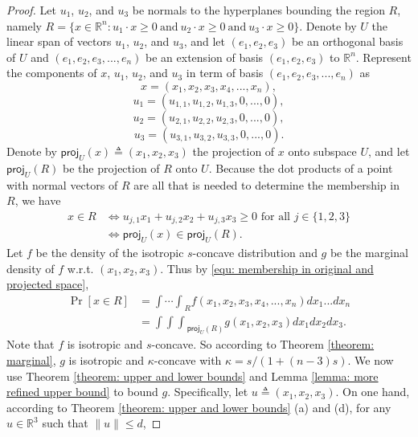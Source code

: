 \documentclass[11pt]{article}
\newcommand{\R}{\mathbb{R}}
\begin{document}
{{{{\medskip
\begin{proof}
Let $u_1$, $u_2$, and $u_3$ be normals to the hyperplanes bounding the region $R$, namely $R=\{x\in\R^n: u_1\cdot x\ge0\ \mbox{and}\ u_2\cdot x\ge 0\ \mbox{and}\ u_3\cdot x\ge 0\}$. Denote by $U$ the linear span of vectors $u_1$, $u_2$, and $u_3$, and let $(e_1,e_2,e_3)$ be an orthogonal basis of $U$ and $(e_1,e_2,e_3,...,e_n)$ be an extension of basis $(e_1,e_2,e_3)$ to $\R^n$. Represent the components of $x$, $u_1$, $u_2$, and $u_3$ in term of basis $(e_1,e_2,e_3,...,e_n)$ as
\begin{equation*}
x=(x_1,x_2,x_3,x_4,...,x_n),
\end{equation*}
\begin{equation*}
u_1=(u_{1,1},u_{1,2},u_{1,3},0,...,0),
\end{equation*}
\begin{equation*}
u_2=(u_{2,1},u_{2,2},u_{2,3},0,...,0),
\end{equation*}
\begin{equation*}
u_3=(u_{3,1},u_{3,2},u_{3,3},0,...,0).
\end{equation*}
Denote by $\textsf{proj}_U(x)\triangleq(x_1,x_2,x_3)$ the projection of $x$ onto subspace $U$, and let $\textsf{proj}_U(R)$ be the projection of $R$ onto $U$. Because the dot products of a point with normal vectors of $R$ are all that is needed to determine the membership in $R$, we have
\begin{equation}
\label{equ: membership in original and projected space}
\begin{split}
x\in R&\Leftrightarrow u_{j,1}x_1+u_{j,2}x_2+u_{j,3}x_3\ge 0\mbox{ for all }j\in\{1,2,3\}\\
&\Leftrightarrow \textsf{proj}_U(x)\in\textsf{proj}_U(R).
\end{split}
\end{equation}
Let $f$ be the density of the isotropic $s$-concave distribution and $g$ be the marginal density of $f$ w.r.t. $(x_1,x_2,x_3)$. Thus by \eqref{equ: membership in original and projected space},
\begin{equation*}
\begin{split}
\Pr[x\in R]&={\int\cdots\int}_R f(x_1,x_2,x_3,x_4,...,x_n)dx_1...dx_n\\
&={\int\int\int}_{\textsf{proj}_U(R)} g(x_1,x_2,x_3)dx_1dx_2dx_3.
\end{split}
\end{equation*}
Note that $f$ is isotropic and $s$-concave. So according to Theorem \ref{theorem: marginal}, $g$ is isotropic and $\kappa$-concave with $\kappa=s/(1+(n-3)s)$. We now use Theorem \ref{theorem: upper and lower bounds} and Lemma \ref{lemma: more refined upper bound} to bound $g$. Specifically, let $u\triangleq(x_1,x_2,x_3)$. On one hand, according to Theorem \ref{theorem: upper and lower bounds} (a) and (d), for any $u\in\R^3$ such that $\|u\|\le d$,

\end{proof}}}}}
\end{document}
